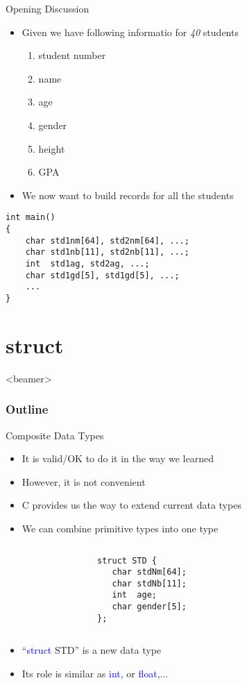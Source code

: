 \begin{frame}[fragile]{Opening Discussion}
\begin{itemize}
	\item {Given we have following informatio for \textit{40} students}
	\begin{enumerate}
		\item {student number}
		\item {name}
		\item {age}
		\item {gender}
		\item {height}
		\item {GPA}
	\end{enumerate}
	\item {We now want to build records for all the students}
\end{itemize}
\begin{lstlisting}[linewidth=0.7\linewidth, xleftmargin=0.05\linewidth]
int main()
{
    char std1nm[64], std2nm[64], ...;
    char std1nb[11], std2nb[11], ...;
    int  std1ag, std2ag, ...;
    char std1gd[5], std1gd[5], ...;
    ...
}
\end{lstlisting}
\end{frame}

\section{struct}
\label{sec:structs}
\begin{frame}<beamer>
    \frametitle{Outline}
    \tableofcontents[currentsection]
\end{frame}

\begin{frame}[fragile]{Composite Data Types}
\begin{itemize}
	\item {It is valid/OK to do it in the way we learned}
	\item {However, it is not convenient}
	\item {C provides us the way to extend current data types}
	\item {We can combine primitive types into one type}
\end{itemize}
\begin{columns}
\begin{column}{0.2\linewidth}
\end{column}
\begin{column}{0.4\linewidth}
\begin{lstlisting}
struct STD {
   char stdNm[64];
   char stdNb[11];
   int  age;
   char gender[5];
};
\end{lstlisting}
\end{column}
\begin{column}{0.2\linewidth}
\end{column}
\end{columns}
\begin{itemize}
	\item {``\textcolor{blue}{struct} STD'' is a new data type}
	\item {Its role is similar as \textcolor{blue}{int}, or \textcolor{blue}{float},...}
\end{itemize}
\end{frame}

